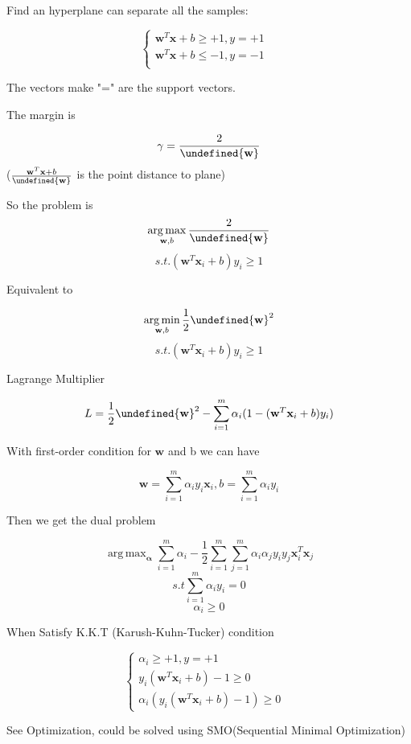 \documentclass[11pt, openany]{book}              %
\let\norm\undefined %
\DeclarePairedDelimiter\norm{\lVert}{\rVert}
\DeclareMathOperator*{\argmax}{arg\,max}  %
\DeclareMathOperator*{\argmin}{arg\,min}  %
\begin{document}
Find an hyperplane can separate all the samples:

$$\left\{
         \begin{array}{lr}
             \mathbf{w}^T\mathbf{x} + b \geq +1,  y = +1 &  \\
             \mathbf{w}^T\mathbf{x} + b \leq -1,  y = -1  
             \\			  
             \end{array}
   \right.$$ 

The vectors make "=" are the support vectors.

The margin is

$$\gamma = \frac{2}{\norm{\mathbf{w}}} $$ ($\frac{\mathbf{w}^T\mathbf{x} + b}{\norm{\mathbf{w}}}$ is the point distance to plane)

So the problem is
$$ \argmax_{\mathbf{w},b} \frac{2}{\norm{\mathbf{w}}}$$
$$s.t. (\mathbf{w}^T\mathbf{x}_i + b)y_i \geq 1$$

Equivalent to

$$ \argmin_{\mathbf{w},b} \frac{1}{2}\norm{\mathbf{w}}^2$$
$$s.t. (\mathbf{w}^T\mathbf{x}_i + b)y_i \geq 1$$

Lagrange Multiplier

$$L = \frac{1}{2}\norm{\mathbf{w}}^2 - \sum_{i=1}^m\alpha_i(1 - (\mathbf{w}^T\mathbf{x}_i + b)y_i)$$

With first-order condition for $\mathbf{w}$ and b we can have

$$\mathbf{w} = \sum_{i=1}^m \alpha_i y_i \mathbf{x}_i, b = \sum_{i=1}^m \alpha_i y_i$$

Then we get the dual problem

$$\argmax_{\boldsymbol{\alpha}}  \sum_{i=1}^m \alpha_i - \frac{1}{2} \sum_{i=1}^m \sum_{j=1}^m \alpha_i \alpha_j y_i y_j \mathbf{x}_i^T\mathbf{x}_j$$
$$s.t \sum_{i=1}^m \alpha_i y_i = 0$$
$$ \alpha_i \geq 0$$

When Satisfy K.K.T (Karush-Kuhn-Tucker) condition 

$$\left\{
         \begin{array}{lr}
             \alpha_i \geq +1,  y = +1 &  \\
              y_i(\mathbf{w}^T\mathbf{x}_i + b) - 1 \geq 0 \\
              \alpha_i( y_i(\mathbf{w}^T\mathbf{x}_i + b) - 1 ) \geq 0 
             \end{array}
   \right.$$ 


See Optimization, could be solved using SMO(Sequential Minimal Optimization)
\end{document}
